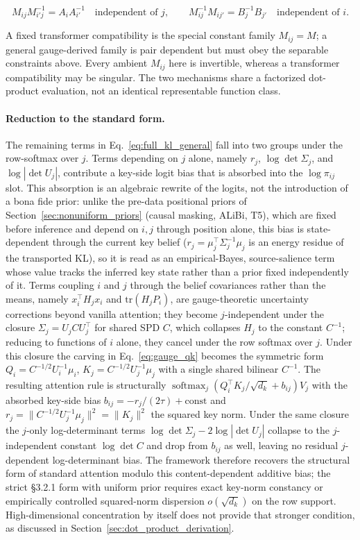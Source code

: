 \documentclass[twoside,11pt]{article}
\begin{document}
\begin{equation}
M_{ij}M_{i'j}^{-1}=A_iA_{i'}^{-1}
\quad\text{independent of }j,
\qquad
M_{ij}^{-1}M_{ij'}=B_j^{-1}B_{j'}
\quad\text{independent of }i.
\label{eq:gauge_bilinear_family_constraints}
\end{equation}

A fixed transformer compatibility is the special constant family $M_{ij}=M$; a general gauge-derived family is pair dependent but must obey the separable constraints above. Every ambient $M_{ij}$ here is invertible, whereas a transformer compatibility may be singular. The two mechanisms share a factorized dot-product evaluation, not an identical representable function class.

\paragraph{Reduction to the standard form.}
The remaining terms in Eq.~\eqref{eq:full_kl_general} fall into two groups under the row-softmax over $j$. Terms depending on $j$ alone, namely $r_j$, $\log\det\Sigma_j$, and $\log|\det U_j|$, contribute a key-side logit bias that is absorbed into the $\log\pi_{ij}$ slot. This absorption is an algebraic rewrite of the logits, not the introduction of a bona fide prior: unlike the pre-data positional priors of Section~\ref{sec:nonuniform_priors} (causal masking, ALiBi, T5), which are fixed before inference and depend on $i,j$ through position alone, this bias is state-dependent through the current key belief ($r_j = \mu_j^\top\Sigma_j^{-1}\mu_j$ is an energy residue of the transported KL), so it is read as an empirical-Bayes, source-salience term whose value tracks the inferred key state rather than a prior fixed independently of it. Terms coupling $i$ and $j$ through the belief covariances rather than the means, namely $x_i^\top H_j x_i$ and $\mathrm{tr}(H_j P_i)$, are gauge-theoretic uncertainty corrections beyond vanilla attention; they become $j$-independent under the closure $\Sigma_j = U_j C U_j^\top$ for shared SPD $C$, which collapses $H_j$ to the constant $C^{-1}$; reducing to functions of $i$ alone, they cancel under the row softmax over $j$. Under this closure the carving in Eq.~\eqref{eq:gauge_qk} becomes the symmetric form $Q_i = C^{-1/2}U_i^{-1}\mu_i$, $K_j = C^{-1/2}U_j^{-1}\mu_j$ with a single shared bilinear $C^{-1}$. The resulting attention rule is structurally $\operatorname{softmax}_j(Q_i^\top K_j/\sqrt{d_k} + b_{ij}) V_j$ with the absorbed key-side bias $b_{ij} = -r_j/(2\tau) + \text{const}$ and $r_j = \|C^{-1/2}U_j^{-1}\mu_j\|^2 = \|K_j\|^2$ the squared key norm. Under the same closure the $j$-only log-determinant terms $\log\det\Sigma_j - 2\log|\det U_j|$ collapse to the $j$-independent constant $\log\det C$ and drop from $b_{ij}$ as well, leaving no residual $j$-dependent log-determinant bias. The framework therefore recovers the structural form of standard attention modulo this content-dependent additive bias; the strict \citet{vaswani2017attention} \S3.2.1 form with uniform prior requires exact key-norm constancy or empirically controlled squared-norm dispersion $o(\sqrt{d_k})$ on the row support. High-dimensional concentration by itself does not provide that stronger condition, as discussed in Section~\ref{sec:dot_product_derivation}.
\end{document}
